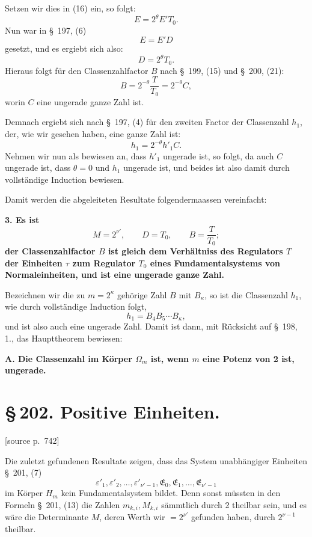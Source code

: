 \documentclass[11pt]{article}
\newcommand{\srcpage}[1]{\par\medskip\noindent\textsf{[source p.~#1]}\par\smallskip}
\begin{document}
Setzen wir dies in (16) ein, so folgt:
\[
E=2^\theta E'T_0.
\]
Nun war in \S~197, (6)
\[
E=E'D
\]
gesetzt, und es ergiebt sich also:
\[
D=2^\theta T_0.
\]
Hieraus folgt für den Classenzahlfactor $B$ nach \S~199, (15) und \S~200, (21):
\begin{equation}
B=2^{-\theta}\frac{T}{T_0}=2^{-\theta}C,
\tag{24}
\end{equation}
worin $C$ eine ungerade ganze Zahl ist.

Demnach ergiebt sich nach \S~197, (4) für den zweiten Factor der Classenzahl $h_1$, der, wie wir gesehen haben, eine ganze Zahl ist:
\begin{equation}
h_1=2^{-\theta}h'_1C.
\tag{25}
\end{equation}
Nehmen wir nun als bewiesen an, dass $h'_1$ ungerade ist, so folgt, da auch $C$ ungerade ist, dass $\theta=0$ und $h_1$ ungerade ist, und beides ist also damit durch vollständige Induction bewiesen.

Damit werden die abgeleiteten Resultate folgendermaassen vereinfacht:

\begin{center}\textbf{3. Es ist}
\[
M=2^{\nu'},\qquad D=T_0,
\qquad B=\frac{T}{T_0};
\tag{26}
\]
\textbf{der Classenzahlfactor $B$ ist gleich dem Verhältniss des Regulators $T$ der Einheiten $\tau$ zum Regulator $T_0$ eines Fundamentalsystems von Normaleinheiten, und ist eine ungerade ganze Zahl.}\end{center}

Bezeichnen wir die zu $m=2^\kappa$ gehörige Zahl $B$ mit $B_\kappa$, so ist die Classenzahl $h_1$, wie durch vollständige Induction folgt,
\begin{equation}
h_1=B_4B_5\cdots B_\kappa,
\tag{27}
\end{equation}
und ist also auch eine ungerade Zahl. Damit ist dann, mit Rücksicht auf \S~198, 1., das Haupttheorem bewiesen:

\begin{center}\textbf{A. Die Classenzahl im Körper $\Omega_m$ ist, wenn $m$ eine Potenz von 2 ist, ungerade.}\end{center}

\section*{\S\,202. Positive Einheiten.}

\srcpage{742}
Die zuletzt gefundenen Resultate zeigen, dass das System unabhängiger Einheiten \S~201, (7)
\[
\varepsilon'_1,\varepsilon'_2,\ldots,\varepsilon'_{\nu'-1},\mathfrak E_0,\mathfrak E_1,\ldots,\mathfrak E_{\nu'-1}
\]
im Körper $H_m$ kein Fundamentalsystem bildet. Denn sonst müssten in den Formeln \S~201, (13) die Zahlen $m_{k,i},M_{k,i}$ sämmtlich durch 2 theilbar sein, und es wäre die Determinante $M$, deren Werth wir $=2^{\nu'}$ gefunden haben, durch $2^{\nu-1}$ theilbar.
\end{document}
